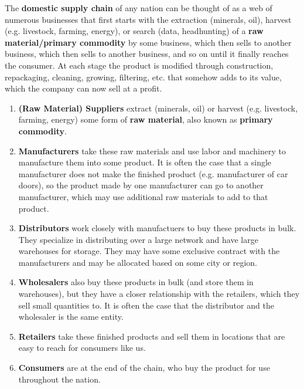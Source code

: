 \documentclass{article}
\begin{document}
    The \textbf{domestic supply chain} of any nation can be thought of as a web of numerous businesses that first starts with the extraction (minerals, oil), harvest (e.g. livestock, farming, energy), or search (data, headhunting) of a \textbf{raw material/primary commodity} by some business, which then sells to another business, which then sells to another business, and so on until it finally reaches the consumer. At each stage the product is modified through construction, repackaging, cleaning, growing, filtering, etc. that somehow adds to its value, which the company can now sell at a profit.

    \begin{enumerate}
      \item \textbf{(Raw Material) Suppliers} extract (minerals, oil) or harvest (e.g. livestock, farming, energy) some form of \textbf{raw material}, also known as \textbf{primary commodity}.
      \item \textbf{Manufacturers} take these raw materials and use labor and machinery to manufacture them into some product. It is often the case that a single manufacturer does not make the finished product (e.g. manufacturer of car doors), so the product made by one manufacturer can go to another manufacturer, which may use additional raw materials to add to that product.
      \item \textbf{Distributors} work closely with manufactuers to buy these products in bulk. They specialize in distributing over a large network and have large warehouses for storage. They may have some exclusive contract with the manufacturers and may be allocated based on some city or region.
      \item \textbf{Wholesalers} also buy these products in bulk (and store them in warehouses), but they have a closer relationship with the retailers, which they sell small quantities to. It is often the case that the distributor and the wholesaler is the same entity.
      \item \textbf{Retailers} take these finished products and sell them in locations that are easy to reach for consumers like us.
      \item \textbf{Consumers} are at the end of the chain, who buy the product for use throughout the nation.
    \end{enumerate}
\end{document}
